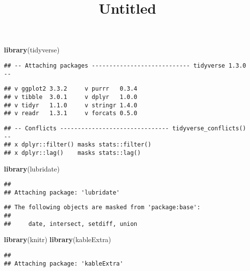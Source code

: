 \documentclass[
]{article}
\title{Untitled}
\author{}
\date{\vspace{-2.5em}}
\newenvironment{Shaded}{\begin{snugshade}}{\end{snugshade}}
\newcommand{\KeywordTok}[1]{\textcolor[rgb]{0.13,0.29,0.53}{\textbf{#1}}}
\newcommand{\NormalTok}[1]{#1}
\begin{document}
\maketitle

\begin{Shaded}
\begin{Highlighting}[]
\KeywordTok{library}\NormalTok{(tidyverse)}
\end{Highlighting}
\end{Shaded}

\begin{verbatim}
## -- Attaching packages ---------------------------- tidyverse 1.3.0 --
\end{verbatim}

\begin{verbatim}
## v ggplot2 3.3.2     v purrr   0.3.4
## v tibble  3.0.1     v dplyr   1.0.0
## v tidyr   1.1.0     v stringr 1.4.0
## v readr   1.3.1     v forcats 0.5.0
\end{verbatim}

\begin{verbatim}
## -- Conflicts ------------------------------- tidyverse_conflicts() --
## x dplyr::filter() masks stats::filter()
## x dplyr::lag()    masks stats::lag()
\end{verbatim}

\begin{Shaded}
\begin{Highlighting}[]
\KeywordTok{library}\NormalTok{(lubridate)}
\end{Highlighting}
\end{Shaded}

\begin{verbatim}
## 
## Attaching package: 'lubridate'
\end{verbatim}

\begin{verbatim}
## The following objects are masked from 'package:base':
## 
##     date, intersect, setdiff, union
\end{verbatim}

\begin{Shaded}
\begin{Highlighting}[]
\KeywordTok{library}\NormalTok{(knitr)}
\KeywordTok{library}\NormalTok{(kableExtra)}
\end{Highlighting}
\end{Shaded}

\begin{verbatim}
## 
## Attaching package: 'kableExtra'
\end{verbatim}
\end{document}
